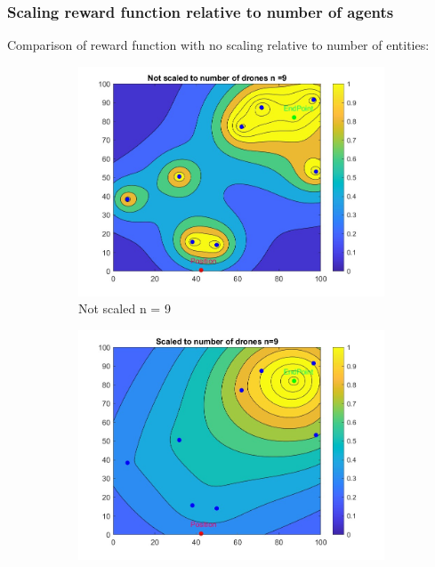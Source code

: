 \subsubsection{Scaling reward function relative to number of agents}
Comparison of reward function with no scaling relative to number of entities:
\begin{figure}[h]
\centering
   \begin{subfigure}[b]{0.43\textwidth}
         \centering
         \includegraphics[width=\textwidth]{figures/RewardFunctionNotscaled9.jpg}
         \caption{Not scaled n = 9}
         \end{subfigure}
         \begin{subfigure}[b]{0.43\textwidth}
         \centering
         \includegraphics[width=\textwidth]{figures/RewardFunctionscaled9.jpg}

\end{subfigure}
\end{figure}
